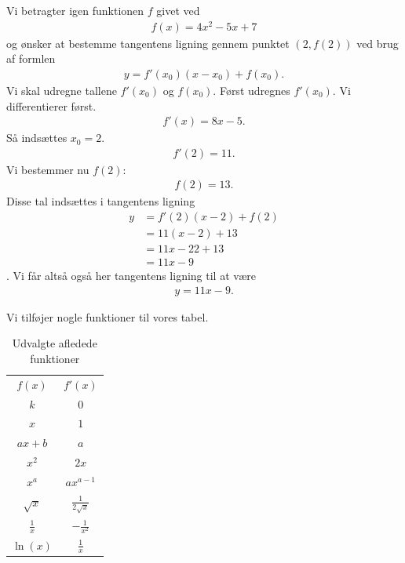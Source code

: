 \begin{exa}
	Vi betragter igen funktionen $f$ givet ved
	\begin{align*}
		f(x) = 4x^2-5x+7
	\end{align*}
	og ønsker at bestemme tangentens ligning gennem punktet $(2,f(2))$ ved brug af formlen
	\begin{align*}
		y = f'(x_0)(x-x_0) + f(x_0).
	\end{align*}
	Vi skal udregne tallene $f'(x_0)$ og $f(x_0)$. Først udregnes $f'(x_0)$.
	Vi differentierer først.
	\begin{align*}
		f'(x) = 8x - 5.
	\end{align*}
	Så indsættes $x_0 = 2.$
	\begin{align*}
		f'(2) = 11.	
	\end{align*}	 
	Vi bestemmer nu $f(2)$:
	\begin{align*}
		f(2) = 13.
	\end{align*}
	Disse tal indsættes i tangentens ligning
	\begin{align*}
		y &= f'(2)(x-2) + f(2)\\
		&= 11(x-2)+13\\
		&= 11x-22+13\\
		&= 11x-9
	\end{align*}.
	Vi får altså også her tangentens ligning til at være
	\begin{align*}
		y = 11x-9.
	\end{align*}
\end{exa}

Vi tilføjer nogle funktioner til vores tabel.
\begin{table}[H]
	\centering
	\begin{tabular}{cc}
		$f(x)$ & $f'(x)$ \\
		$k$ & $0$ \\
		$x$ & $1$ \\
		$ax + b$  & $a$ \\
		$x^2$ & $2x$ \\
		$x^a$ & $ax^{a-1} $ \\
		$\sqrt{x}$ & $\frac{1}{2\sqrt{x}}$ \\
		$\frac{1}{x}$ & $-\frac{1}{x^2}$ \\
		$\ln(x)$ & $\frac{1}{x}$ \\
	\end{tabular}
	\caption{Udvalgte afledede funktioner}
	\label{tab:afledt}
\end{table}

